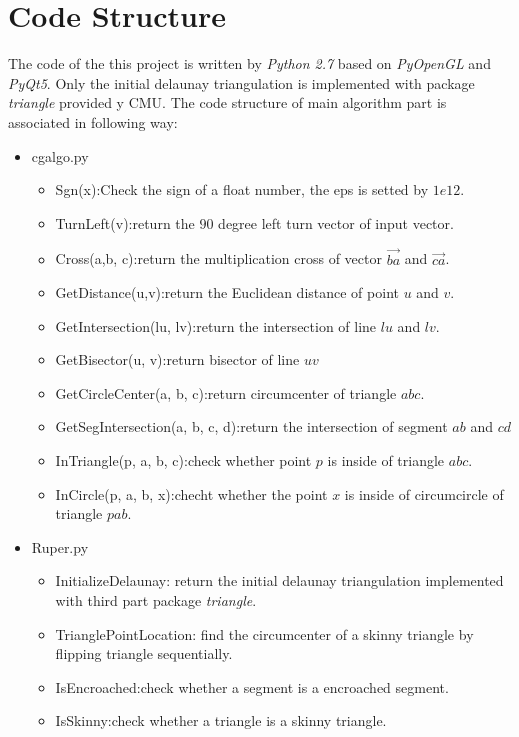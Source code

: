 \documentclass[letterpaper,12pt]{article}
\begin{document}
\section{Code Structure}
\label{sec:02}

The code of the this project is written by \emph{Python 2.7} based on \emph{PyOpenGL} and
\emph{PyQt5}. Only the initial delaunay triangulation is implemented with package \emph{triangle}
provided y CMU. The code structure of main algorithm part is associated in following way:

\begin{itemize}
\item cgalgo.py 
\begin{itemize}
\item Sgn(x):Check the sign of a float number, the eps is setted by $1e12$.
\item TurnLeft(v):return the $90$ degree left turn vector of input vector. 
\item Cross(a,b, c):return the multiplication cross of vector $\vec{ba}$ and $\vec{ca}$.  
\item GetDistance(u,v):return the Euclidean distance of point $u$ and $v$.  
\item GetIntersection(lu, lv):return the intersection of line $lu$ and $lv$.  
\item GetBisector(u, v):return bisector of line $uv$
\item GetCircleCenter(a, b, c):return circumcenter of triangle $abc$.  
\item GetSegIntersection(a, b, c, d):return the intersection of segment $ab$ and $cd$ 
\item InTriangle(p, a, b, c):check whether point $p$ is inside of triangle $abc$.  
\item InCircle(p, a, b, x):checht whether the point $x$ is inside of circumcircle of triangle $pab$.
\end{itemize}
\item Ruper.py 
\begin{itemize}
\item InitializeDelaunay: return the initial delaunay triangulation implemented
with third part package \emph{triangle}.  
\item TrianglePointLocation: find the circumcenter of a skinny triangle by flipping triangle
sequentially.  
\item IsEncroached:check whether a segment is a encroached segment.  
\item IsSkinny:check whether a triangle is a skinny triangle.

\end{itemize}
\end{itemize}
\end{document}
